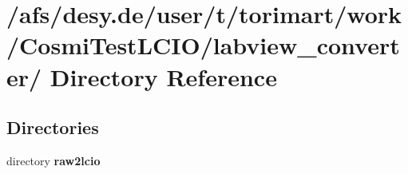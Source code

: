 \section{/afs/desy.de/user/t/torimart/work/CosmiTestLCIO/labview\_\-converter/ Directory Reference}
\label{dir_c5b743f48f9eb5a75f6b18e12f728180}
\subsection*{Directories}
\begin{DoxyCompactItemize}
\item 
directory {\bf raw2lcio}
\end{DoxyCompactItemize}
